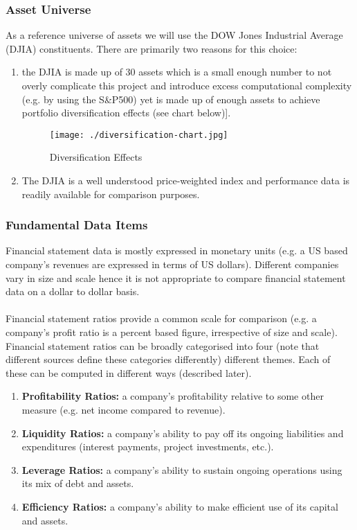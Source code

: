 \documentclass[dvips,12pt]{article}
\begin{document}
\subsubsection*{Asset Universe}
As a reference universe of assets we will use the DOW Jones Industrial Average (DJIA) constituents. There are primarily two reasons for this choice:
\begin{enumerate}
\item the DJIA is made up of 30 assets which is a small enough number to not overly complicate this project and introduce excess computational complexity (e.g. by using the S\&P500) yet is made up of enough assets to achieve portfolio diversification effects (see chart below)]\cite{sharpe1972}. 
\begin{figure}
  \texttt{[image: ./diversification-chart.jpg]}
  \caption{Diversification Effects}
  \label{fig:diversification}
\end{figure}
\item The DJIA is a well understood price-weighted index and performance data is readily available for comparison purposes.
\end{enumerate}

\subsubsection*{Fundamental Data Items}
Financial statement data is mostly expressed in monetary units (e.g. a US based company's revenues are expressed in terms of US dollars). Different companies vary in size and scale hence it is not appropriate to compare financial statement data on a dollar to dollar basis.
\\\\
Financial statement ratios provide a common scale for comparison (e.g. a company's profit ratio is a percent based figure, irrespective of size and scale). Financial statement ratios can be broadly categorised into four (note that different sources define these categories differently) different themes. Each of these can be computed in different ways (described later).

\begin{enumerate}
\item \textbf{Profitability Ratios:} a company's profitability relative to some other measure (e.g. net income compared to revenue).
\item \textbf{Liquidity Ratios:} a company's ability to pay off its ongoing liabilities and expenditures (interest payments, project investments, etc.).
\item \textbf{Leverage Ratios:} a company's ability to sustain ongoing operations using its mix of debt and assets.
\item \textbf{Efficiency Ratios:} a company's ability to make efficient use of its capital and assets.
\end{enumerate}
\end{document}
